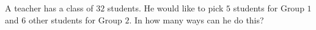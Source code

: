 A teacher has a class of $32$ students. He would like to pick $5$ students for Group $1$ and $6$ other students for Group $2$. In how many ways can he do this?
